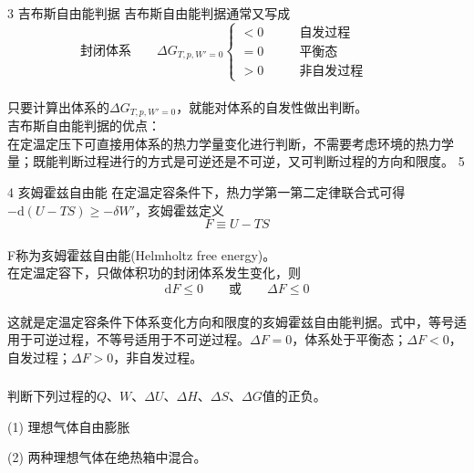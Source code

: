\begin{frame}{3 吉布斯自由能判据}
    吉布斯自由能判据通常又写成
    $$\text{封闭体系}\qquad \Delta G_{T,p,W'=0}\left\{
    \begin{aligned}
        <0 &\qquad \text{自发过程} \qquad\\
        =0 &\qquad \text{平衡态} \qquad\\
        >0 &\qquad \text{非自发过程} \qquad
    \end{aligned}    
    \right.
    $$
    \\只要计算出体系的$\Delta G_{T,p,W'=0}$，就能对体系的自发性做出判断。
    \\吉布斯自由能判据的优点：
    \\在定温定压下可直接用体系的热力学量变化进行判断，不需要考虑环境的热力学量；既能判断过程进行的方式是可逆还是不可逆，又可判断过程的方向和限度。
5\end{frame}


\begin{frame}{4 亥姆霍兹自由能}
    在定温定容条件下，热力学第一第二定律联合式可得$-\mathrm{d}(U-TS)\ge -\delta W'$，亥姆霍兹定义
    $$F\equiv U-TS$$
    \\F称为亥姆霍兹自由能(Helmholtz free energy)。
    \\在定温定容下，只做体积功的封闭体系发生变化，则
    $$\mathrm{d}F \le 0 \qquad \text{或} \qquad \Delta F \le 0$$
    \\这就是定温定容条件下体系变化方向和限度的亥姆霍兹自由能判据。式中，等号适用于可逆过程，不等号适用于不可逆过程。$\Delta F = 0$，体系处于平衡态；$\Delta F < 0$，自发过程；$\Delta F > 0$，非自发过程。
\end{frame}


\begin{frame}[t]
    \frametitle{}
    \begin{example}
        判断下列过程的$Q$、$W$、$\Delta U$、$\Delta H$、$\Delta S$、$\Delta G$值的正负。

        (1) 理想气体自由膨胀

        (2) 两种理想气体在绝热箱中混合。
    \end{example}
\end{frame}